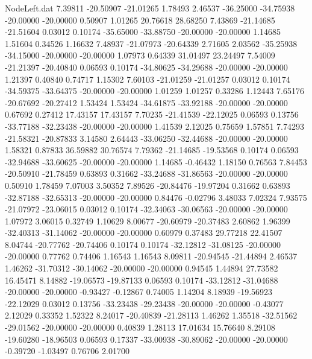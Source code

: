 \begin{filecontents}{NodeLeft.dat}
   7.39811  -20.50907  -21.01265     1.78493    2.46537  -36.25000  -34.75938  -20.00000  -20.00000    0.50907    1.01265   20.76618   28.68250
   7.43869  -21.14685  -21.51604     0.03012    0.10174  -35.65000  -33.88750  -20.00000  -20.00000    1.14685    1.51604    0.34526    1.16632
   7.48937  -21.07973  -20.64339     2.71605    2.03562  -35.25938  -34.15000  -20.00000  -20.00000    1.07973    0.64339   31.01497   23.24497
   7.54009  -21.21397  -20.40840     0.06593    0.10174  -34.80625  -34.29688  -20.00000  -20.00000    1.21397    0.40840    0.74717    1.15302
   7.60103  -21.01259  -21.01257     0.03012    0.10174  -34.59375  -33.64375  -20.00000  -20.00000    1.01259    1.01257    0.33286    1.12443
   7.65176  -20.67692  -20.27412     1.53424    1.53424  -34.61875  -33.92188  -20.00000  -20.00000    0.67692    0.27412   17.43157   17.43157
   7.70235  -21.41539  -22.12025     0.06593    0.13756  -33.77188  -32.23438  -20.00000  -20.00000    1.41539    2.12025    0.75659    1.57851
   7.74293  -21.58321  -20.87833     3.14580    2.64443  -33.06250  -32.44688  -20.00000  -20.00000    1.58321    0.87833   36.59882   30.76574
   7.79362  -21.14685  -19.53568     0.10174    0.06593  -32.94688  -33.60625  -20.00000  -20.00000    1.14685   -0.46432    1.18150    0.76563
   7.84453  -20.50910  -21.78459     0.63893    0.31662  -33.24688  -31.86563  -20.00000  -20.00000    0.50910    1.78459    7.07003    3.50352
   7.89526  -20.84476  -19.97204     0.31662    0.63893  -32.87188  -32.65313  -20.00000  -20.00000    0.84476   -0.02796    3.48033    7.02324
   7.93575  -21.07972  -23.06015     0.03012    0.10174  -32.34063  -30.06563  -20.00000  -20.00000    1.07972    3.06015    0.32749    1.10629
   8.00677  -20.60979  -20.37483     2.60862    1.96399  -32.40313  -31.14062  -20.00000  -20.00000    0.60979    0.37483   29.77218   22.41507
   8.04744  -20.77762  -20.74406     0.10174    0.10174  -32.12812  -31.08125  -20.00000  -20.00000    0.77762    0.74406    1.16543    1.16543
   8.09811  -20.94545  -21.44894     2.46537    1.46262  -31.70312  -30.14062  -20.00000  -20.00000    0.94545    1.44894   27.73582   16.45471
   8.14882  -19.06573  -19.87133     0.06593    0.10174  -33.12812  -31.04688  -20.00000  -20.00000   -0.93427   -0.12867    0.74005    1.14204
   8.18939  -19.56923  -22.12029     0.03012    0.13756  -33.23438  -29.23438  -20.00000  -20.00000   -0.43077    2.12029    0.33352    1.52322
   8.24017  -20.40839  -21.28113     1.46262    1.35518  -32.51562  -29.01562  -20.00000  -20.00000    0.40839    1.28113   17.01634   15.76640
   8.29108  -19.60280  -18.96503     0.06593    0.17337  -33.00938  -30.89062  -20.00000  -20.00000   -0.39720   -1.03497    0.76706    2.01700

\end{filecontents}
